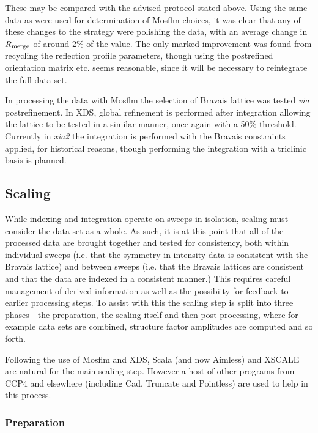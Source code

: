 \documentclass[preprint,pdf]{iucr}
\begin{document}
\noindent
These may be compared with the advised protocol stated above. Using
the same data as were used for determination of Mosflm choices, it was
clear that any of these changes to the strategy were polishing the
data, with an average change in $R_{\rm{merge}}$ of around 2\% of the
value. The only marked improvement was found from recycling the
reflection profile parameters, though using the postrefined
orientation matrix etc. seems reasonable, since it will be necessary
to reintegrate the full data set.

In processing the data with Mosflm the selection of Bravais lattice
was tested \emph{via} postrefinement. In XDS, global refinement is
performed after integration allowing the lattice to be tested in a
similar manner, once again with a 50\% threshold. Currently in
\emph{xia2} the integration is performed with the Bravais constraints
applied, for historical reasons, though performing the integration
with a triclinic basis is planned. 

\subsection{Scaling}

While indexing and integration operate on sweeps in isolation,
scaling must consider the data set as a whole. As such, it is at this
point that all of the processed data are brought together and tested
for consistency, both within individual sweeps (i.e. that the symmetry
in intensity data is consistent with the Bravais lattice) and between
sweeps (i.e. that the Bravais lattices are consistent and that the
data are indexed in a consistent manner.) This requires careful
management of derived information as well as the possibiity for feedback to
earlier processing steps. To assist with this the scaling step is
split into three phases - the preparation, the scaling itself and then
post-processing, where for example data sets are combined, structure
factor amplitudes are computed and so forth.

Following the use of Mosflm and XDS, Scala (and now Aimless) and
XSCALE are natural for the main scaling step. However a host of other
programs from CCP4 and elsewhere (including Cad, Truncate and
Pointless) are used to help in this process.

\subsubsection{Preparation}
\end{document}
